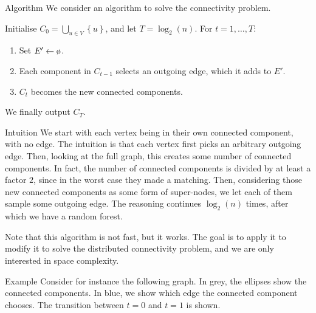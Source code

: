 \documentclass[a4paper]{article}
\begin{document}
\begin{parag}{Algorithm}
    We consider an algorithm to solve the connectivity problem.

    Initialise $C_0 = \bigcup_{u \in V} \left\{u\right\}$, and let $T = \log_{2}\left(n\right)$. For $t = 1, \ldots, T$:
    \begin{enumerate}
        \item Set $E' \leftarrow \o$.
        \item Each component in $C_{t-1}$ selects an outgoing edge, which it adds to $E'$.
        \item $C_t$ becomes the new connected components.
    \end{enumerate}

    We finally output $C_T$.

    \begin{subparag}{Intuition}
        We start with each vertex being in their own connected component, with no edge. The intuition is that each vertex first picks an arbitrary outgoing edge. Then, looking at the full graph, this creates some number of connected components. In fact, the number of connected components is divided by at least a factor $2$, since in the worst case they made a matching. Then, considering those new connected components as some form of super-nodes, we let each of them sample some outgoing edge. The reasoning continues $\log_{2}\left(n\right)$ times, after which we have a random forest. 

        Note that this algorithm is not fast, but it works. The goal is to apply it to modify it to solve the distributed connectivity problem, and we are only interested in space complexity.
    \end{subparag}

    \begin{subparag}{Example}
        Consider for instance the following graph. In grey, the ellipses show the connected components. In blue, we show which edge the connected component chooses. The transition between $t = 0$ and $t = 1$ is shown.

    \end{subparag}
\end{parag}
\end{document}
